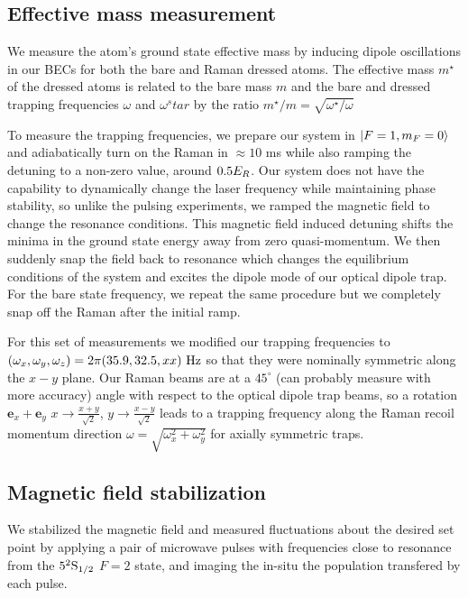 \subsection{Effective mass measurement}

We measure the atom's ground state effective mass by inducing dipole oscillations in our BECs for both the bare and Raman dressed atoms. The effective mass $m^{\star}$ of the dressed atoms is related to the bare mass $m$ and the bare and dressed trapping frequencies $\omega$ and $\omega{^star}$ by the ratio $m^{\star}/m=\sqrt{\omega^{\star}/\omega}$

 To measure the trapping frequencies, we prepare our system in $|F=1,m_F=0\rangle$ and adiabatically turn on the Raman in $\approx10$ ms while also ramping the detuning to a non-zero value, around $0.5{{E_R}}$. Our system does not have the capability to dynamically change the laser frequency while maintaining phase stability, so unlike the pulsing experiments, we ramped the magnetic field to change the resonance conditions. This magnetic field induced detuning shifts the minima in the ground state energy away from zero quasi-momentum. We then suddenly snap the field back to resonance which changes the equilibrium conditions of the system and excites the dipole mode of our optical dipole trap. For the bare state frequency, we repeat the same procedure but we completely snap off the Raman after the initial ramp. 

For this set of measurements we modified our trapping frequencies to $(\omega_x, \omega_y, \omega_z)=2\pi(35.9, 32.5, xx) {\ {\rm Hz}}$  so that they were nominally symmetric along the $x-y$ plane. Our Raman beams are at a $45^{\circ}$ (can probably measure with more accuracy) angle with respect to the optical dipole trap beams, so a rotation $\mathbf{e}_x+\mathbf{e}_y$   $x\rightarrow\frac{x+y}{\sqrt{2}}$, $y\rightarrow\frac{x-y}{\sqrt{2}}$ leads to a trapping frequency along the Raman recoil momentum direction
$\omega=\sqrt{\omega_x^2+\omega_y^2}$ for axially symmetric traps. 

\subsection{Magnetic field stabilization}
We stabilized the magnetic field and measured fluctuations about the desired set point by applying a pair of microwave pulses with frequencies close to resonance from the $5^2{\rm S}_{1/2}$ $F=2$ state, and imaging the in-situ the population transfered by each pulse. 

